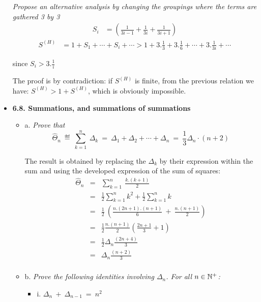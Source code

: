 \begin{itemize}
\medskip

{\em Propose an alternative analysis by changing the groupings where the terms are gathered 3 by 3}
\[ 
\begin{array}{ll}
S_i & = \left( \frac{1}{3i-1} + \frac{1}{3i} + \frac{1}{3i+1} \right) 
\end{array} \]
\[ 
\begin{array}{ll}
S^{(H)}  & = 1 + S_1 +  \cdots + S_i + \cdots  > 1 + 3.\frac{1}{3} + 3.\frac{1}{6} + \cdots + 3.\frac{1}{3i} + \cdots
\end{array} \]

since $S_i > 3.\frac{1}{i} $

The proof is by contradiction:
if $S^{(H)} $ is finite, from the previous relation we have: $S^{(H)}  > 1 + S^{(H)} $, which is obviously impossible.
\medskip

\item
{\bf 6.8. Summations, and summations of summations}
\smallskip

  \begin{itemize}
  \item a.
{\em Prove that}
\[ \widehat{\Theta}_n \ \eqdef \  \sum_{k=1}^n \ \Delta_k \ = \   
\Delta_1 + \Delta_2 + \cdots + \Delta_n \ = \ \frac{1}{3} \Delta_n \cdot (n+2) \]

The result is obtained by replacing the $\Delta_k$ by their expression within the sum
and using the developed expression of the sum of squares:
\begin{eqnarray*}
\widehat{\Theta}_n & = & \sum_{k=1}^n \ \frac{k.(k+1)}{2} \\
 & = & \frac{1}{2} \sum_{k=1}^n k^2  + \frac{1}{2} \sum_{k=1}^n k  \\
 & = & \frac{1}{2} \ \left( \frac{n.(2n+1).(n+1)}{6} \ + \ \frac{n.(n+1)}{2} \right)\\
 & = & \frac{1}{2} \frac{n.(n+1)}{2} \left( \frac{2n+1}{3} + 1 \right)  \\
 & = & \frac{1}{2} \Delta_n \frac{(2n+4)}{3}  \\
  & = & \Delta_n \frac{(n+2)}{3}  \\
\end{eqnarray*} 


  \item b.
{\em Prove the following identities involving $\Delta_n$.  For all $n \in \mathbb{N}^+$:}
    \begin{itemize}
    \item i.
$\Delta_n \ + \ \Delta_{n-1} \ = \ n^2$


\end{itemize}
\end{itemize}
\end{itemize}
